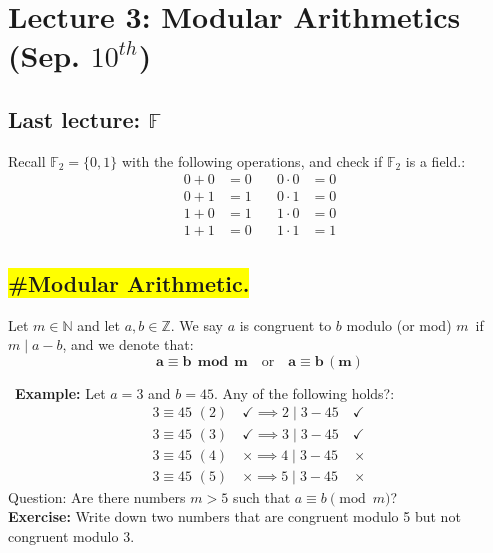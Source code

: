 \section*{Lecture 3: Modular Arithmetics (Sep. $10^{th}$)}


\subsection*{Last lecture: $\mathbb{F}$}
\qquad Recall \( \mathbb{F}_2 = \{0, 1\} \) with the following operations, and check if \( \mathbb{F}_2 \) is a field.:
    \[\begin{aligned}
        0 + 0 &= 0 \quad & 0 \cdot 0 &= 0 \\
        0 + 1 &= 1 \quad & 0 \cdot 1 &= 0 \\
        1 + 0 &= 1 \quad & 1 \cdot 0 &= 0 \\
        1 + 1 &= 0 \quad & 1 \cdot 1 &= 1 
    \end{aligned}\]


\subsection*{\colorbox{yellow}{\#Modular Arithmetic.}}
    \qquad Let \( m \in \mathbb{N} \) and let \( a, b \in \mathbb{Z} \). We say \( a \) is congruent to \( b \) modulo (or mod) \( m \)\, if \, \(m \mid a - b\), and we denote that:
    \[\boldsymbol{a \equiv b \;\, \textbf{mod} \;\, m} \quad \text{or} \quad \boldsymbol{a \equiv b \, (m)}\]

\vspace*{0.2cm}

    \,\,\,\textbf{Example:} Let \( a = 3 \) and \( b = 45 \). Any of the following holds?:
        \[\begin{aligned}
            3 \equiv 45 \,\,(2) \quad \checkmark  \implies 2 \mid 3 - 45 \quad \checkmark\\ 
            3 \equiv 45 \,\,(3) \quad \checkmark  \implies 3 \mid 3 - 45 \quad \checkmark\\
            3 \equiv 45 \,\,(4) \quad \times \implies 4 \mid 3 - 45 \quad \times\\
            3 \equiv 45 \,\,(5) \quad \times \implies 5 \mid 3 - 45 \quad \times
        \end{aligned}\]
        \qquad \qquad  Question: Are there numbers \( m > 5 \) such that \( a \equiv b \pmod{m} \)?\\
        
        \qquad \textbf{Exercise:} Write down two numbers that are congruent modulo 5 but not congruent modulo 3.\\
        
